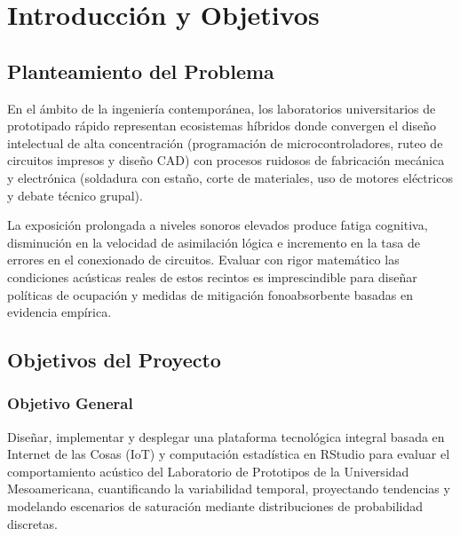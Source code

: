 \documentclass{article}
\begin{document}
\RaggedRight

\newpage
\tableofcontents
\newpage

\listoffigures
\vspace{0.8cm}
\listoftables
\newpage

\cleardoublepage
\pagestyle{plain}

\section{Introducción y Objetivos}

\subsection{Planteamiento del Problema}
En el ámbito de la ingeniería contemporánea, los laboratorios universitarios de prototipado rápido representan ecosistemas híbridos donde convergen el diseño intelectual de alta concentración (programación de microcontroladores, ruteo de circuitos impresos y diseño CAD) con procesos ruidosos de fabricación mecánica y electrónica (soldadura con estaño, corte de materiales, uso de motores eléctricos y debate técnico grupal). 

La exposición prolongada a niveles sonoros elevados produce fatiga cognitiva, disminución en la velocidad de asimilación lógica e incremento en la tasa de errores en el conexionado de circuitos. Evaluar con rigor matemático las condiciones acústicas reales de estos recintos es imprescindible para diseñar políticas de ocupación y medidas de mitigación fonoabsorbente basadas en evidencia empírica.

\subsection{Objetivos del Proyecto}

\subsubsection{Objetivo General}
Diseñar, implementar y desplegar una plataforma tecnológica integral basada en Internet de las Cosas (IoT) y computación estadística en RStudio para evaluar el comportamiento acústico del Laboratorio de Prototipos de la Universidad Mesoamericana, cuantificando la variabilidad temporal, proyectando tendencias y modelando escenarios de saturación mediante distribuciones de probabilidad discretas.
\end{document}
